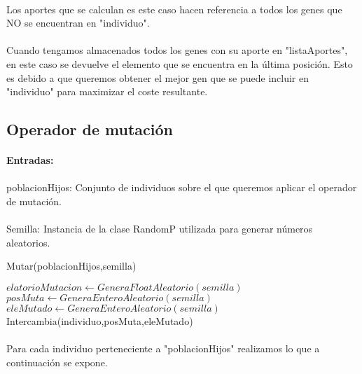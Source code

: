 	\paragraph{}Los aportes que se calculan es este caso hacen referencia a todos los genes que NO se encuentran en "individuo".
	
	\paragraph{}Cuando tengamos almacenados todos los genes con su aporte en "listaAportes", en este caso se devuelve el elemento que se encuentra en la última posición. Esto es debido a que queremos obtener el mejor gen que se puede incluir en "individuo" para maximizar el coste resultante.
	
	\subsection{Operador de mutación}
	
	\paragraph{Entradas:}
	
	\paragraph{}poblacionHijos: Conjunto de individuos sobre el que queremos aplicar el operador de mutación.
	
	\paragraph{}Semilla: Instancia de la clase RandomP utilizada para generar números aleatorios.

	\begin{algorithm}[H]
		\caption{Mutar(poblacionHijos,semilla)}
		\begin{algorithmic}
			\STATE $elatorioMutacion\leftarrow GeneraFloatAleatorio(semilla)$
			\STATE $posMuta \leftarrow GeneraEnteroAleatorio(semilla)$
			\STATE $eleMutado \leftarrow GeneraEnteroAleatorio(semilla)$
			\STATE Intercambia(individuo,posMuta,eleMutado)
			\ENDIF
			\ENDFOR
		\end{algorithmic}
	\end{algorithm}

	\paragraph{}Para cada individuo perteneciente a "poblacionHijos" realizamos lo que a continuación se expone.
	
